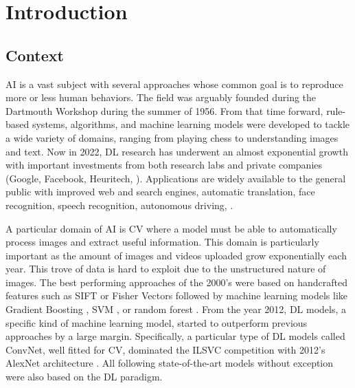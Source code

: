 \chapter{Introduction}
\label{chapter:introduction}

{}


\section{Context}

\acf{AI} is a vast subject with several approaches whose common goal is to reproduce more or less
human behaviors. The field was arguably founded during the Dartmouth Workshop during the summer of
1956. From that time forward, rule-based systems, algorithms, and machine learning models were
developed to tackle a wide variety of domains, ranging from playing chess to understanding images
and text. Now in 2022, \ac{DL} research has underwent an almost exponential growth with important investments
from both research labs and private companies (\eg Google, Facebook, Heuritech, \etc). Applications
are widely available to the general public with improved web and search engines, automatic
translation, face recognition, speech recognition, autonomous driving, \etc.

A particular domain of \ac{AI} is \ac{CV} where a model must be able to automatically process images
and extract useful information. This domain is particularly important as the amount of images and
videos uploaded grow exponentially each year. This trove of data is hard to exploit due to the
unstructured nature of images. The best performing approaches of the 2000's were based on
handcrafted features such as SIFT \citep{lowe1999sift} or Fisher Vectors  followed by
machine learning models like Gradient Boosting , \acs{SVM} \citep{cortes1995svm}, or
random forest . From the year 2012, \acf{DL} models, a specific kind of machine learning
model, started to outperform previous approaches by a large margin. Specifically, a particular type
of \ac{DL} models called \acs{ConvNet}, well fitted for \ac{CV}, dominated the ILSVC competition
\citep{russakovsky2015imagenet_ilsvrc} with 2012's AlexNet architecture
\citep{krizhevsky2012alexnet}. All following state-of-the-art models without exception were also based on the
\ac{DL} paradigm.

